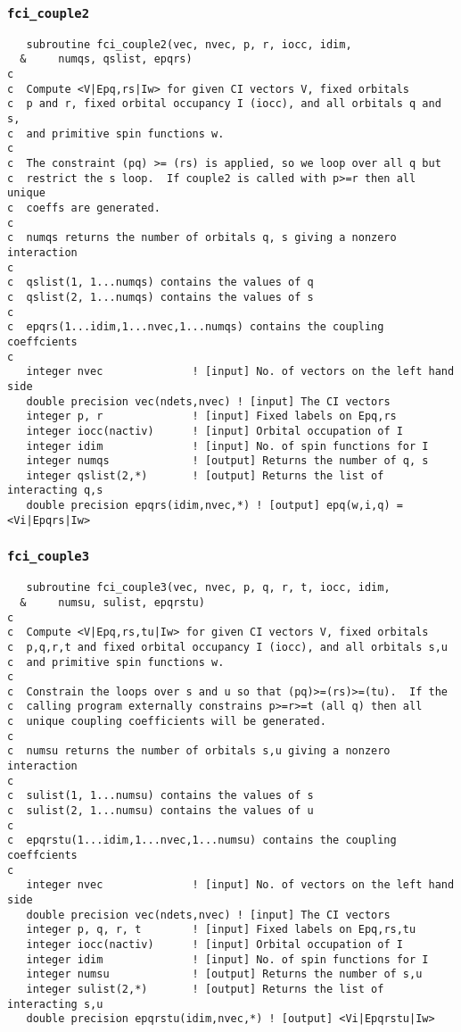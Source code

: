 \subsubsection{{\tt fci\_couple2}}
\begin{verbatim}
   subroutine fci_couple2(vec, nvec, p, r, iocc, idim, 
  &     numqs, qslist, epqrs)
c  
c  Compute <V|Epq,rs|Iw> for given CI vectors V, fixed orbitals
c  p and r, fixed orbital occupancy I (iocc), and all orbitals q and s,
c  and primitive spin functions w.
c
c  The constraint (pq) >= (rs) is applied, so we loop over all q but
c  restrict the s loop.  If couple2 is called with p>=r then all unique
c  coeffs are generated.
c
c  numqs returns the number of orbitals q, s giving a nonzero interaction
c  
c  qslist(1, 1...numqs) contains the values of q
c  qslist(2, 1...numqs) contains the values of s
c  
c  epqrs(1...idim,1...nvec,1...numqs) contains the coupling coeffcients
c  
   integer nvec              ! [input] No. of vectors on the left hand side
   double precision vec(ndets,nvec) ! [input] The CI vectors
   integer p, r              ! [input] Fixed labels on Epq,rs
   integer iocc(nactiv)      ! [input] Orbital occupation of I
   integer idim              ! [input] No. of spin functions for I
   integer numqs             ! [output] Returns the number of q, s
   integer qslist(2,*)       ! [output] Returns the list of interacting q,s
   double precision epqrs(idim,nvec,*) ! [output] epq(w,i,q) = <Vi|Epqrs|Iw>
\end{verbatim}

\subsubsection{{\tt fci\_couple3}}
\begin{verbatim}
   subroutine fci_couple3(vec, nvec, p, q, r, t, iocc, idim, 
  &     numsu, sulist, epqrstu)
c  
c  Compute <V|Epq,rs,tu|Iw> for given CI vectors V, fixed orbitals
c  p,q,r,t and fixed orbital occupancy I (iocc), and all orbitals s,u
c  and primitive spin functions w.
c
c  Constrain the loops over s and u so that (pq)>=(rs)>=(tu).  If the
c  calling program externally constrains p>=r>=t (all q) then all
c  unique coupling coefficients will be generated.
c  
c  numsu returns the number of orbitals s,u giving a nonzero interaction
c  
c  sulist(1, 1...numsu) contains the values of s
c  sulist(2, 1...numsu) contains the values of u
c  
c  epqrstu(1...idim,1...nvec,1...numsu) contains the coupling coeffcients
c  
   integer nvec              ! [input] No. of vectors on the left hand side
   double precision vec(ndets,nvec) ! [input] The CI vectors
   integer p, q, r, t        ! [input] Fixed labels on Epq,rs,tu
   integer iocc(nactiv)      ! [input] Orbital occupation of I
   integer idim              ! [input] No. of spin functions for I
   integer numsu             ! [output] Returns the number of s,u
   integer sulist(2,*)       ! [output] Returns the list of interacting s,u
   double precision epqrstu(idim,nvec,*) ! [output] <Vi|Epqrstu|Iw>
\end{verbatim}


